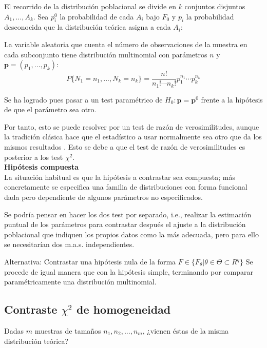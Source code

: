 \documentclass[a4paper,12pt]{article}
\begin{document}
El recorrido de la distribución poblacional se divide en $k$ conjuntos disjuntos $A_1,...,A_k$. Sea $p^0_i$ la probabilidad de cada $A_i$ bajo $F_0$ y $p_i$ la probabilidad desconocida que la distribución teórica asigna a cada $A_i$:

La variable aleatoria que cuenta el número de observaciones de la muestra en cada subconjunto tiene distribución multinomial con parámetros $n$ y $\textbf{p}= (p_1,...,p_k)$:
$$P\{N_1=n_1,...,N_k=n_k\}= \frac{n!}{n_1!\cdots n_k!} p^{n_1}_1\cdots p^{n_k}_k$$

Se ha logrado pues pasar a un test paramétrico de $H_0 :   \textbf{p} = \textbf{p}^0$ frente a la hipótesis de que el parámetro sea otro.

Por tanto, esto se puede resolver por un test de razón de verosimilitudes, aunque la tradición clásica hace que el estadístico a usar normalmente sea otro que da los mismos resultados . Esto se debe a que el test de razón de verosimilitudes es posterior a los test $\chi^2$.
\\

\textbf{Hipótesis compuesta} \\
La situación habitual es que la hipótesis a contrastar sea compuesta; más concretamente se especifica una familia de distribuciones con forma funcional dada pero dependiente de algunos parámetros no especificados.

Se podría pensar en hacer los dos test por separado, i.e., realizar la estimación puntual de los parámetros para contrastar después el ajuste a la distribución poblacional que indiquen los propios datos como la más adecuada, pero para ello se necesitarían dos m.a.s. independientes.

Alternativa: Contrastar una hipótesis nula de la forma $F \in \{F_\theta| \theta \in \Theta \subset R^q\}$
Se procede de igual manera que con la hipótesis simple, terminando por comparar paramétricamente una distribución multinomial.

\subsection{Contraste $\chi^2$ de homogeneidad}
Dadas $m$ muestras de tamaños $n_1, n_2,...,n_m$, ¿vienen éstas de la misma distribución teórica?

\end{document}
